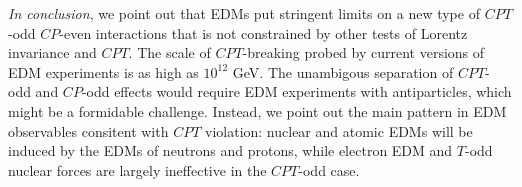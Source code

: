 \documentclass[prl,twocolumn,tightenlines,preprintnumbers,floatfix,nofootinbib]{revtex4}
\begin{document}

{\em In conclusion}, we point out that EDMs put stringent limits on a new type of 
$CPT$-odd $CP$-even interactions that is not constrained by other tests
of Lorentz invariance and $CPT$. The scale of $CPT$-breaking probed by 
current versions of EDM experiments is as high as $10^{12}$ GeV. 
The unambigous separation of $CPT$-odd and $CP$-odd 
effects would require EDM experiments with antiparticles, which might be a formidable 
challenge. Instead, we point out the main pattern in EDM observables consitent with $CPT$
violation: nuclear and atomic EDMs will be induced by the EDMs of neutrons and protons, 
while electron EDM and $T$-odd nuclear forces are largely ineffective in the $CPT$-odd case.
\end{document}
